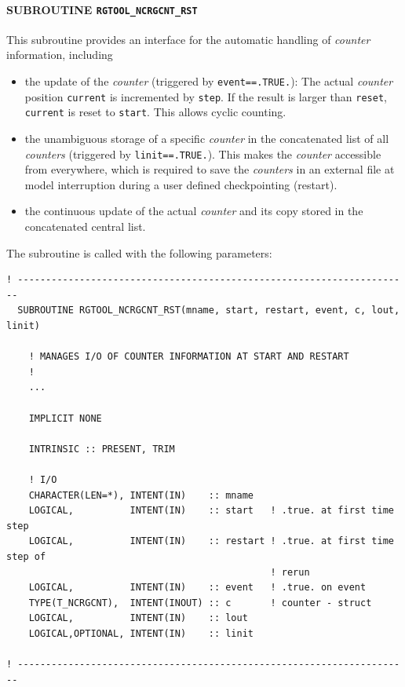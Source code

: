 \documentclass[11pt,twoside]{report}
\begin{document}
\paragraph{SUBROUTINE \color{blue} \tt\bf RGTOOL\_NCRGCNT\_RST\\ \label{IGCNTRST}}
This subroutine provides an interface for the automatic handling of
 {\it counter}  information, including
\begin{itemize}
\item the update of the {\it counter} (triggered
 by \verb|event==.TRUE.|): The actual  {\it counter} position 
\verb|current| is incremented by \verb|step|. If the result is larger
than  \verb|reset|, 
  \verb|current| is reset to  \verb|start|. This allows cyclic counting.
\item the unambiguous storage of a specific {\it counter} in the
concatenated list of all {\it counters} (triggered
 by \verb|linit==.TRUE.|). This makes the {\it counter}
accessible from everywhere, which is required to save the {\it
counters} in an external file at model interruption during a user defined
 checkpointing (restart). 
\item the continuous update of the actual {\it counter} and its
 copy stored in the concatenated central list.
\end{itemize}
The subroutine is called with the following parameters:
\begin{verbatim}
! ----------------------------------------------------------------------
  SUBROUTINE RGTOOL_NCRGCNT_RST(mname, start, restart, event, c, lout, linit)

    ! MANAGES I/O OF COUNTER INFORMATION AT START AND RESTART
    !
    ...

    IMPLICIT NONE

    INTRINSIC :: PRESENT, TRIM

    ! I/O
    CHARACTER(LEN=*), INTENT(IN)    :: mname
    LOGICAL,          INTENT(IN)    :: start   ! .true. at first time step
    LOGICAL,          INTENT(IN)    :: restart ! .true. at first time step of
                                               ! rerun
    LOGICAL,          INTENT(IN)    :: event   ! .true. on event
    TYPE(T_NCRGCNT),  INTENT(INOUT) :: c       ! counter - struct
    LOGICAL,          INTENT(IN)    :: lout
    LOGICAL,OPTIONAL, INTENT(IN)    :: linit

! ----------------------------------------------------------------------
\end{verbatim}
\end{document}
